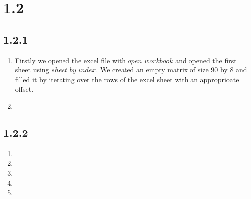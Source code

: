\documentclass[12pt]{article}
\begin{document}
\section*{1.2}
\subsection*{1.2.1}
\begin{enumerate}[a]
	\item %
	Firstly we opened the excel file with $open\_workbook$ and opened the first sheet using $sheet\_by\_index$. We created an empty matrix of size 90 by 8 and filled it by iterating over the rows of the excel sheet with an approprioate offset.

	\item %
\end{enumerate}

\subsection*{1.2.2}
\begin{enumerate}[a]
	\item %
	\item %
	\item %
	\item %
	\item %
\end{enumerate}
\end{document}
